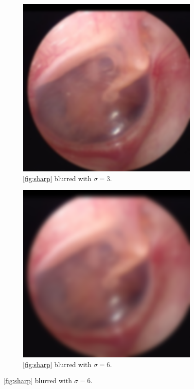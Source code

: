 \begin{figure}[H]
    \begin{subfigure}[t]{0.3\textwidth}
        \includegraphics[width=\textwidth]{Figures/BlurredImages/Gaussian/128.png}
        \caption{\ref{fig:sharp} blurred with $\sigma = 3$.}
        \label{fig:synth_blur_3}
    \end{subfigure}\hspace{1em}
    \begin{subfigure}[t]{0.3\textwidth}
        \includegraphics[width=\textwidth]{Figures/BlurredImages/Gaussian/196.png}
        \caption{\ref{fig:sharp} blurred with $\sigma = 6$.}
        \label{fig:blur_synth_6}
    \end{subfigure}
\end{figure}




